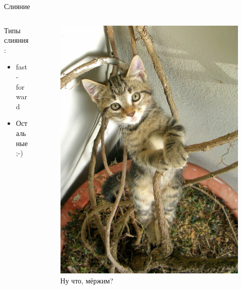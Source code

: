 \documentclass[presentation]{beamer}
\begin{document}
\begin{frame}{Слияние}
\begin{columns}
\begin{column}{.5\textwidth}
      Типы слияния:
      \begin{itemize}
      \item fast-forward
      \item Остальные  ;-)
      \end{itemize}
    \end{column}
      \begin{column}{.5\textwidth}
        \begin{figure}[htb]
          \centering
          \includegraphics[height=.8\textheight]{Fazen_-_charming_(by)}
          \newline
          Ну что, мёржим?
        \end{figure}
      \end{column}
    \end{columns}
\end{frame}
\end{document}
